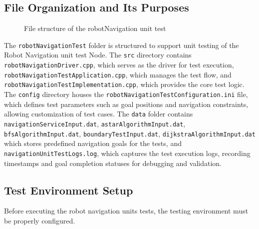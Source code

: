 \documentclass{CSSRforAfrica}
\renewcommand{\DTstyle}{\footnotesize\sffamily}
\begin{document}
\subsection{File Organization and Its Purposes}
\vspace*{0.5em}
\begin{figure}[H]
	\renewcommand*\DTstyle{\ttfamily}
	\caption{File structure of the robotNavigation unit test}
	\label{fig:navigation_test_structure}
\end{figure}

\noindent The \texttt{robotNavigationTest} folder is structured to support unit testing of the Robot Navigation unit test Node. The \texttt{src} directory contains \texttt{robotNavigationDriver.cpp}, which serves as the driver for test execution, \texttt{robotNavigationTestApplication.cpp}, which manages the test flow, and \texttt{robotNavigationTestImplementation.cpp}, which provides the core test logic.\\


\noindent The \texttt{config} directory houses the \texttt{robotNavigationTestConfiguration.ini} file, which defines test parameters such as goal positions and navigation constraints, allowing customization of test cases. The \texttt{data} folder contains \texttt{navigationServiceInput.dat}, \texttt{astarAlgorithmInput.dat}, \texttt{bfsAlgorithmInput.dat}, \texttt{boundaryTestInput.dat}, \texttt{dijkstraAlgorithmInput.dat} which stores predefined navigation goals for the tests, and \texttt{navigationUnitTestLogs.log}, which captures the test execution logs, recording timestamps and goal completion statuses for debugging and validation.



\subsection{Test Environment Setup}
Before executing the robot navigation units tests, the testing environment must be properly configured.
\end{document}
